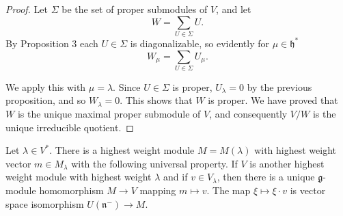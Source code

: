 \documentclass[12pt]{article}
\begin{document}
\begin{proof}
    Let $\Sigma$ be the set of proper submodules of $V$, and let
    \[
        W = \sum_{U \in \Sigma} U.
    \]
    By Proposition 3 each $U \in \Sigma$ is diagonalizable, so evidently for $\mu \in \mathfrak{h}^*$
    \[
        W_\mu = \sum_{U \in \Sigma} U_\mu.
    \]

    We apply this with $\mu = \lambda$. Since $U \in \Sigma$ is proper, $U_\lambda = 0$ by the previous proposition, and so $W_\lambda = 0$. This shows that $W$ is proper. We have proved that $W$ is the unique maximal proper submodule of $V$, and consequently $V/W$ is the unique irreducible quotient.
\end{proof}

\begin{theorem}
    Let $\lambda \in V^*$. There is a highest weight module $M = M(\lambda)$ with highest weight vector $m \in M_\lambda$ with the following universal property. If $V$ is another highest weight module with highest weight $\lambda$ and if $v \in V_\lambda$, then there is a unique $\mathfrak{g}$-module homomorphism $M \to V$ mapping $m \mapsto v$. The map $\xi \mapsto \xi \cdot v$ is vector space isomorphism $U(\mathfrak{n}^-) \to M$.
\end{theorem}
\end{document}
